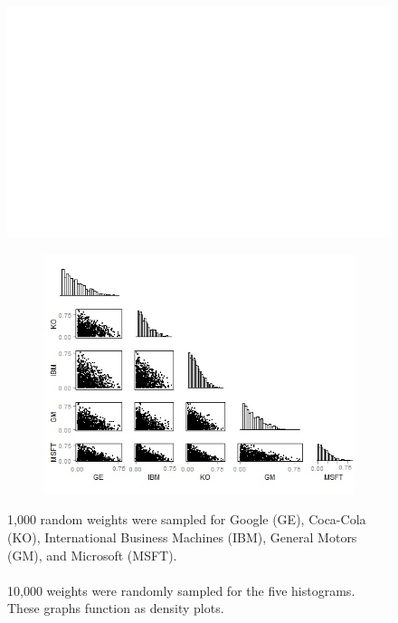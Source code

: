 \documentclass{article}\usepackage{graphicx, color}
\makeatletter
\def\maxwidth{ %
  \ifdim\Gin@nat@width>\linewidth
    \linewidth
  \else
    \Gin@nat@width
  \fi
}
\newenvironment{knitrout}{}{} %
\makeatother
\begin{document}
\begin{figure}[H]
\begin{knitrout}
\color{fgcolor}
\includegraphics[width=\maxwidth]{figure/fiveByFiveGrid} 

\end{knitrout}

\end{figure}

\begin{figure}[H]
  \begin{subfigure}[b]{1.0\textwidth}
    \centering
    \includegraphics[width=\textwidth]{5v5}
    \label{fig:5v5}
  \end{subfigure}
\caption{1,000 random weights were sampled for Google (GE), Coca-Cola (KO), International Business Machines (IBM), General Motors (GM), and Microsoft (MSFT).
\\
\\
10,000 weights were randomly sampled for the five histograms. These graphs function as density plots.}
\end{figure}
\end{document}
